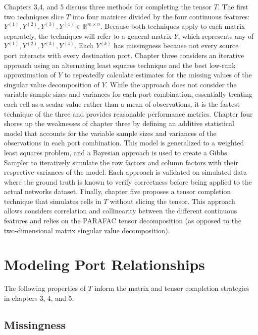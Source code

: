 \documentclass[12pt,twoside]{dukestatscithesis}
\theoremstyle{definition}
\theoremstyle{definition}
\theoremstyle{definition}
\theoremstyle{remark}
\begin{document}
Chapters 3,4, and 5 discuss three methods for completing the tensor
\(T\). The first two techniques slice \(T\) into four matrices divided
by the four continuous features:
\(Y^{(1)}, Y^{(2)}, Y^{(3)}, Y^{(4)} \in \mathbb{R}^{m \times n}\).
Because both techniques apply to each matrix separately, the techniques
will refer to a general matrix \(Y\), which represents any of
\(Y^{(1)}, Y^{(2)}, Y^{(3)}, Y^{(4)}\). Each \(Y^{(k)}\) has missingness
because not every source port interacts with every destination port.
Chapter three considers an iterative approach using an alternating least
squares technique and the best low-rank approximation of \(Y\) to
repeatedly calculate estimates for the missing values of the singular
value decomposition of \(Y\). While the approach does not consider the
variable sample sizes and variances for each port combination,
essentially treating each cell as a scalar value rather than a mean of
observations, it is the fastest technique of the three and provides
reasonable performance metrics. Chapter four shores up the weaknesses of
chapter three by defining an additive statistical model that accounts
for the variable sample sizes and variances of the observations in each
port combination. This model is generalized to a weighted least squares
problem, and a Bayesian approach is used to create a Gibbs Sampler to
iteratively simulate the row factors and column factors with their
respective variances of the model. Each approach is validated on
simulated data where the ground truth is known to verify correctness
before being applied to the actual networks dataset. Finally, chapter
five proposes a tensor completion technique that simulates cells in
\(T\) without slicing the tensor. This approach allows considers
correlation and collinearity between the different continuous features
and relies on the PARAFAC tensor decomposition (as opposed to the
two-dimensional matrix singular value decomposition).

\chapter{Modeling Port Relationships}\label{modeling-port-relationships}

The following properties of \(T\) inform the matrix and tensor
completion strategies in chapters 3, 4, and 5.

\section{Missingness}\label{missingness}
\end{document}
